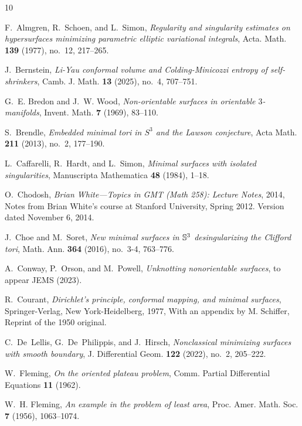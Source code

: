 \documentclass[11pt, reqno]{amsart}
\numberwithin{equation}{section}
\begin{document}
\begin{thebibliography}{10}
	
	F.~Almgren, R.~Schoen, and L.~Simon, \emph{Regularity and singularity estimates
		on hypersurfaces minimizing parametric elliptic variational integrals}, Acta.
	Math. \textbf{139} (1977), no.~12, 217--265.
	
	J.~Bernstein, \emph{Li-{Y}au conformal volume and {C}olding-{M}inicozzi entropy
		of self-shrinkers}, Camb. J. Math. \textbf{13} (2025), no.~4, 707--751.
	
	G.~E. Bredon and J.~W. Wood, \emph{Non-orientable surfaces in orientable
		{$3$}-manifolds}, Invent. Math. \textbf{7} (1969), 83--110.
	
	S.~Brendle, \emph{Embedded minimal tori in {$S^3$} and the {L}awson
		conjecture}, Acta Math. \textbf{211} (2013), no.~2, 177--190.
	
	L.~Caffarelli, R.~Hardt, and L.~Simon, \emph{Minimal surfaces with isolated
		singularities}, Manuscripta Mathematica \textbf{48} (1984), 1--18.
	
	O.~Chodosh, \emph{{Brian White---Topics in GMT (Math 258): Lecture Notes}},
	2014, Notes from Brian White's course at Stanford University, Spring 2012.
	Version dated November 6, 2014.
	
	J.~Choe and M.~Soret, \emph{New minimal surfaces in {$\Bbb S^3$}
		desingularizing the {C}lifford tori}, Math. Ann. \textbf{364} (2016),
	no.~3-4, 763--776.
	
	A.~Conway, P.~Orson, and M.~Powell, \emph{Unknotting nonorientable surfaces},
	to appear JEMS (2023).
	
	R.~Courant, \emph{Dirichlet's principle, conformal mapping, and minimal
		surfaces}, Springer-Verlag, New York-Heidelberg, 1977, With an appendix by M.
	Schiffer, Reprint of the 1950 original.
	
	C.~De~Lellis, G.~De~Philippis, and J.~Hirsch, \emph{Nonclassical minimizing
		surfaces with smooth boundary}, J. Differential Geom. \textbf{122} (2022),
	no.~2, 205--222.
	
	W.~Fleming, \emph{On the oriented plateau problem}, Comm. Partial Differential
	Equations \textbf{11} (1962).
	
	W.~H. Fleming, \emph{An example in the problem of least area}, Proc. Amer.
	Math. Soc. \textbf{7} (1956), 1063--1074.
	

\end{thebibliography}
\end{document}
